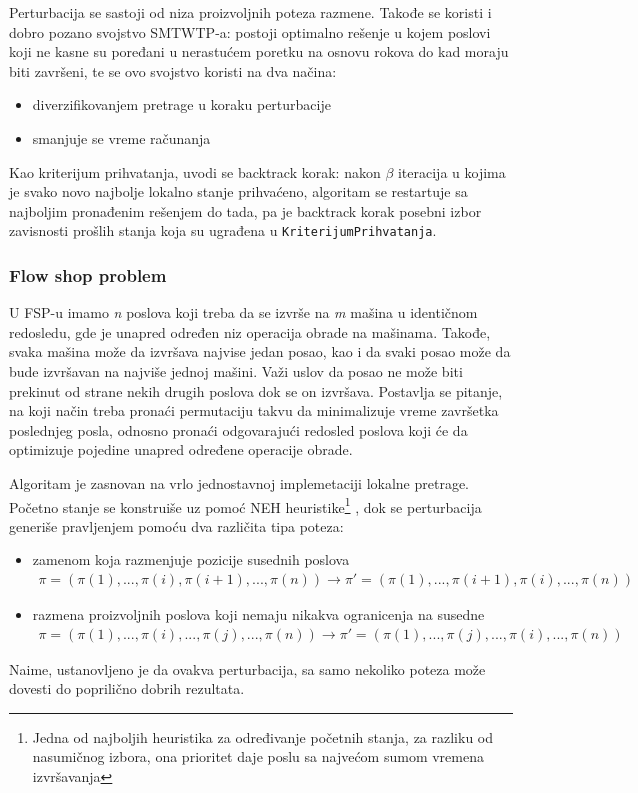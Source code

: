 \documentclass[a4paper]{article}
\newcommand{\kriterijum}[0]{\small{\texttt{KriterijumPrihvatanja}}}
\begin{document}
Perturbacija se sastoji od niza proizvoljnih poteza razmene. Takođe se koristi i dobro pozano svojstvo SMTWTP-a: postoji optimalno rešenje u kojem poslovi koji ne kasne su poređani u nerastućem poretku na osnovu rokova do kad moraju biti završeni, te se ovo svojstvo koristi na dva načina:
\begin{itemize}
  \item diverzifikovanjem pretrage u koraku perturbacije
  \item smanjuje se vreme računanja
\end{itemize}
Kao kriterijum prihvatanja, uvodi se backtrack korak: nakon $\beta$ iteracija u kojima je svako novo najbolje lokalno stanje prihvaćeno, algoritam se restartuje sa najboljim pronađenim rešenjem do tada, pa je backtrack korak posebni izbor zavisnosti prošlih stanja koja su ugrađena u \kriterijum. \cite{handbookOfMetaheuristics,designOfIteratedLocalSearchAlgorithms}

\subsubsection{Flow shop problem}
U FSP-u imamo \textit{n} poslova koji treba da se izvrše na \textit{m} mašina u identičnom redosledu, gde je unapred određen niz operacija obrade na mašinama. Takođe, svaka mašina može da izvršava najvise jedan posao, kao i da svaki posao može da bude izvršavan na najviše jednoj mašini. Važi uslov da posao ne može biti prekinut od strane nekih drugih poslova dok se on izvršava.  Postavlja se pitanje, na koji način treba pronaći permutaciju takvu da minimalizuje
vreme završetka poslednjeg posla, odnosno pronaći odgovarajući redosled poslova koji će da optimizuje pojedine unapred određene operacije obrade.

Algoritam je zasnovan na vrlo jednostavnoj implemetaciji lokalne pretrage. Početno stanje se konstruiše uz pomoć NEH heuristike\footnote{Jedna od najboljih heuristika za određivanje početnih stanja, za razliku od nasumičnog izbora, ona prioritet daje poslu sa najvećom sumom vremena izvršavanja }
, dok se perturbacija generiše pravljenjem pomoću dva različita tipa poteza:
\begin{itemize}
  \item zamenom koja razmenjuje pozicije susednih poslova \\
	\begin{gather*}
	 \pi = (\pi(1),..., \pi(i), \pi(i+1),..., \pi(n)) \rightarrow \pi\prime =  ( \pi(1),...,  \pi(i+1),  \pi(i),...,  \pi(n))
	\end{gather*}
  \item razmena proizvoljnih poslova koji nemaju nikakva ogranicenja na susedne \\
	\begin{gather*}
	 \pi = (\pi(1),..., \pi(i),..., \pi(j),..., \pi(n)) \rightarrow \pi\prime =  ( \pi(1),...,  \pi(j),...,  \pi(i),...,  \pi(n))
	\end{gather*}
\end{itemize}
Naime, ustanovljeno je da ovakva perturbacija, sa samo nekoliko poteza može dovesti do poprilično dobrih rezultata.
\end{document}
